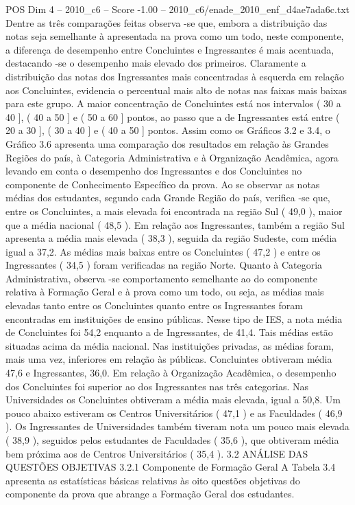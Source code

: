 \begin{textsample}{POS Dim 4 – 2010\_c6 – Score -1.00 – 2010\_c6/enade\_2010\_enf\_d4ae7ada6c.txt}
Dentre as três comparações feitas observa -se que, embora a distribuição das notas seja semelhante à apresentada na prova como um todo, neste componente, a diferença de desempenho entre Concluintes e Ingressantes é mais acentuada, destacando -se o desempenho mais elevado dos primeiros.
Claramente a distribuição das notas dos Ingressantes mais concentradas à esquerda em relação aos Concluintes, evidencia o percentual mais alto de notas nas faixas mais baixas para este grupo.
A maior concentração de Concluintes está nos intervalos ( 30 a 40 ], ( 40 a 50 ] e ( 50 a 60 ] pontos, ao passo que a de Ingressantes está entre ( 20 a 30 ], ( 30 a 40 ] e ( 40 a 50 ] pontos.
Assim como os Gráficos 3.2 e 3.4, o Gráfico 3.6 apresenta uma comparação dos resultados em relação às Grandes Regiões do país, à Categoria Administrativa e à Organização Acadêmica, agora levando em conta o desempenho dos Ingressantes e dos Concluintes no componente de Conhecimento Específico da prova.
Ao se observar as notas médias dos estudantes, segundo cada Grande Região do país, verifica -se que, entre os Concluintes, a mais elevada foi encontrada na região Sul ( 49,0 ), maior que a média nacional ( 48,5 ).
Em relação aos Ingressantes, também a região Sul apresenta a média mais elevada ( 38,3 ), seguida da região Sudeste, com média igual a 37,2.
As médias mais baixas entre os Concluintes ( 47,2 ) e entre os Ingressantes ( 34,5 ) foram verificadas na região Norte.
Quanto à Categoria Administrativa, observa -se comportamento semelhante ao do componente relativa à Formação Geral e à prova como um todo, ou seja, as médias mais elevadas tanto entre os Concluintes quanto entre os Ingressantes foram encontradas em instituições de ensino públicas.
Nesse tipo de IES, a nota média de Concluintes foi 54,2 enquanto a de Ingressantes, de 41,4.
Tais médias estão situadas acima da média nacional.
Nas instituições privadas, as médias foram, mais uma vez, inferiores em relação às públicas.
Concluintes obtiveram média 47,6 e Ingressantes, 36,0.
Em relação à Organização Acadêmica, o desempenho dos Concluintes foi superior ao dos Ingressantes nas três categorias.
Nas Universidades os Concluintes obtiveram a média mais elevada, igual a 50,8.
Um pouco abaixo estiveram os Centros Universitários ( 47,1 ) e as Faculdades ( 46,9 ).
Os Ingressantes de Universidades também tiveram nota um pouco mais elevada ( 38,9 ), seguidos pelos estudantes de Faculdades ( 35,6 ), que obtiveram média bem próxima aos de Centros Universitários ( 35,4 ). 3.2 ANÁLISE DAS QUESTÕES OBJETIVAS 3.2.1 Componente de Formação Geral A Tabela 3.4 apresenta as estatísticas básicas relativas às oito questões objetivas do componente da prova que abrange a Formação Geral dos estudantes.

\end{textsample}
